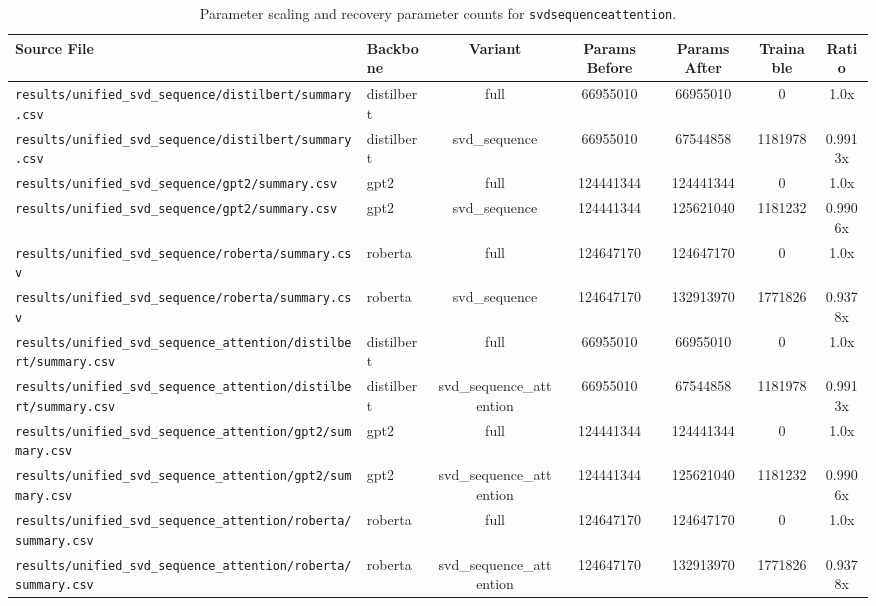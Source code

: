 \begin{table}[t]
\centering
\small
\begin{tabular}{llccccc}
\toprule
\textbf{Source File} & \textbf{Backbone} & \textbf{Variant} & \textbf{Params Before} & \textbf{Params After} & \textbf{Trainable} & \textbf{Ratio} \\
\midrule
\texttt{results/unified\_svd\_sequence/distilbert/summary.csv} & distilbert & full & 66955010 & 66955010 & 0 & 1.0x \\
\texttt{results/unified\_svd\_sequence/distilbert/summary.csv} & distilbert & svd\_sequence & 66955010 & 67544858 & 1181978 & 0.9913x \\
\texttt{results/unified\_svd\_sequence/gpt2/summary.csv} & gpt2 & full & 124441344 & 124441344 & 0 & 1.0x \\
\texttt{results/unified\_svd\_sequence/gpt2/summary.csv} & gpt2 & svd\_sequence & 124441344 & 125621040 & 1181232 & 0.9906x \\
\texttt{results/unified\_svd\_sequence/roberta/summary.csv} & roberta & full & 124647170 & 124647170 & 0 & 1.0x \\
\texttt{results/unified\_svd\_sequence/roberta/summary.csv} & roberta & svd\_sequence & 124647170 & 132913970 & 1771826 & 0.9378x \\
\texttt{results/unified\_svd\_sequence\_attention/distilbert/summary.csv} & distilbert & full & 66955010 & 66955010 & 0 & 1.0x \\
\texttt{results/unified\_svd\_sequence\_attention/distilbert/summary.csv} & distilbert & svd\_sequence\_attention & 66955010 & 67544858 & 1181978 & 0.9913x \\
\texttt{results/unified\_svd\_sequence\_attention/gpt2/summary.csv} & gpt2 & full & 124441344 & 124441344 & 0 & 1.0x \\
\texttt{results/unified\_svd\_sequence\_attention/gpt2/summary.csv} & gpt2 & svd\_sequence\_attention & 124441344 & 125621040 & 1181232 & 0.9906x \\
\texttt{results/unified\_svd\_sequence\_attention/roberta/summary.csv} & roberta & full & 124647170 & 124647170 & 0 & 1.0x \\
\texttt{results/unified\_svd\_sequence\_attention/roberta/summary.csv} & roberta & svd\_sequence\_attention & 124647170 & 132913970 & 1771826 & 0.9378x \\
\bottomrule
\end{tabular}
\caption{Parameter scaling and recovery parameter counts for \texttt{svdsequenceattention}.}
\label{tab:results_params_svdsequenceattention}
\end{table}

